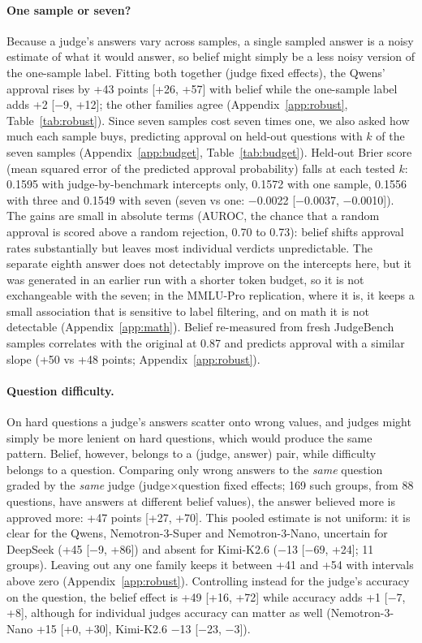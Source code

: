 \documentclass[11pt]{article}
\begin{document}
\paragraph{One sample or seven?}
Because a judge's answers vary across samples, a single sampled answer is a noisy estimate of what it would answer,
so belief might simply be a less noisy version of the one-sample label. Fitting both together (judge fixed effects),
the Qwens' approval rises by +43 points [+26, +57] with belief while the one-sample label adds +2 [$-$9, +12]; the other families agree (Appendix~\ref{app:robust}, Table~\ref{tab:robust}). Since seven samples cost seven times one, we also asked how much
each sample buys, predicting approval on held-out questions with $k$ of the seven samples (Appendix~\ref{app:budget}, Table~\ref{tab:budget}).
Held-out Brier score (mean squared error of the predicted approval probability) falls at each tested $k$: 0.1595 with judge-by-benchmark intercepts only, 0.1572 with one sample,
0.1556 with three and 0.1549 with seven (seven vs one: $-$0.0022 [$-$0.0037, $-$0.0010]). The gains are small in
absolute terms (AUROC, the chance that a random approval is scored above a random rejection, 0.70 to 0.73): belief shifts approval rates substantially but leaves most individual verdicts
unpredictable. The separate eighth answer does not detectably improve on the intercepts here, but it was generated
in an earlier run with a shorter token budget, so it is not exchangeable with the seven; in the MMLU-Pro replication, where it is, it keeps a small association that is sensitive to label filtering, and on
math it is not detectable (Appendix~\ref{app:math}). Belief re-measured from fresh JudgeBench samples correlates with the
original at 0.87 and predicts approval with a similar slope (+50 vs +48 points; Appendix~\ref{app:robust}).

\paragraph{Question difficulty.}
On hard questions a judge's answers scatter onto wrong values, and judges might simply be more lenient on hard
questions, which would produce the same pattern. Belief, however, belongs to a (judge, answer) pair, while
difficulty belongs to a question. Comparing only wrong answers to the \emph{same} question graded by the \emph{same}
judge (judge$\times$question fixed effects; 169 such groups, from 88 questions, have answers at different belief
values), the answer believed more is approved more: +47 points [+27, +70]. This pooled estimate is not uniform: it
is clear for the Qwens, Nemotron-3-Super and Nemotron-3-Nano, uncertain for DeepSeek (+45 [$-$9, +86]) and absent
for Kimi-K2.6 ($-$13 [$-$69, +24]; 11 groups). Leaving out any one family keeps it between +41 and +54 with
intervals above zero (Appendix~\ref{app:robust}). Controlling instead for the judge's accuracy on the question, the
belief effect is +49 [+16, +72] while accuracy adds +1 [$-$7, +8], although for individual judges accuracy can
matter as well (Nemotron-3-Nano +15 [+0, +30], Kimi-K2.6 $-$13 [$-$23, $-$3]).
\end{document}
